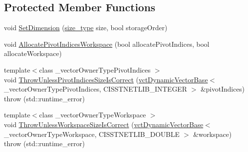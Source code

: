 \subsection*{Protected Member Functions}
\begin{DoxyCompactItemize}
\item 
void \hyperlink{classnmr_inverse_dynamic_data_a054d4de772b71ab8da045f070f00aa1a}{Set\-Dimension} (\hyperlink{classnmr_inverse_dynamic_data_aeb5c2317adf50d8fc7952a9b38bf0129}{size\-\_\-type} size, bool storage\-Order)
\item 
void \hyperlink{classnmr_inverse_dynamic_data_accb38be41c1792e06d5d97748990682c}{Allocate\-Pivot\-Indices\-Workspace} (bool allocate\-Pivot\-Indices, bool allocate\-Workspace)
\item 
{\footnotesize template$<$class \-\_\-vector\-Owner\-Type\-Pivot\-Indices $>$ }\\void \hyperlink{classnmr_inverse_dynamic_data_a25f183e2ef43867ea19f98422818abb5}{Throw\-Unless\-Pivot\-Indices\-Size\-Is\-Correct} (\hyperlink{classvct_dynamic_vector_base}{vct\-Dynamic\-Vector\-Base}$<$ \-\_\-vector\-Owner\-Type\-Pivot\-Indices, C\-I\-S\-S\-T\-N\-E\-T\-L\-I\-B\-\_\-\-I\-N\-T\-E\-G\-E\-R $>$ \&pivot\-Indices)  throw (std\-::runtime\-\_\-error)
\item 
{\footnotesize template$<$class \-\_\-vector\-Owner\-Type\-Workspace $>$ }\\void \hyperlink{classnmr_inverse_dynamic_data_ae330256d35b7e69cb5e39532b92365ed}{Throw\-Unless\-Workspace\-Size\-Is\-Correct} (\hyperlink{classvct_dynamic_vector_base}{vct\-Dynamic\-Vector\-Base}$<$ \-\_\-vector\-Owner\-Type\-Workspace, C\-I\-S\-S\-T\-N\-E\-T\-L\-I\-B\-\_\-\-D\-O\-U\-B\-L\-E $>$ \&workspace)  throw (std\-::runtime\-\_\-error)
\end{DoxyCompactItemize}
